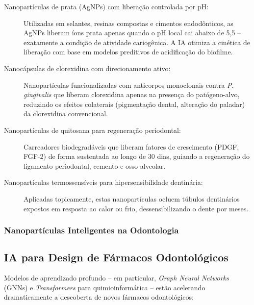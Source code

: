 \begin{description}
  \item[Nanopartículas de prata (AgNPs) com liberação controlada por pH:]
    Utilizadas em selantes, resinas compostas e cimentos endodônticos, as AgNPs
    liberam íons prata apenas quando o pH local cai abaixo de 5,5 -- exatamente
    a condição de atividade cariogênica. A IA otimiza a cinética de liberação
    com base em modelos preditivos de acidificação do biofilme.

  \item[Nanocápsulas de clorexidina com direcionamento ativo:] Nanopartículas
    funcionalizadas com anticorpos monoclonais contra \textit{P. gingivalis}
    que liberam clorexidina apenas na presença do patógeno-alvo, reduzindo os
    efeitos colaterais (pigmentação dental, alteração do paladar) da
    clorexidina convencional.

  \item[Nanopartículas de quitosana para regeneração periodontal:] Carreadores
    biodegradáveis que liberam fatores de crescimento (PDGF, FGF-2) de forma
    sustentada ao longo de 30 dias, guiando a regeneração do ligamento
    periodontal, cemento e osso alveolar.

  \item[Nanopartículas termossensíveis para hipersensibilidade dentinária:]
    Aplicadas topicamente, estas nanopartículas ocluem túbulos dentinários
    expostos em resposta ao calor ou frio, dessensibilizando o dente por meses.
\end{description}

\subsubsection{Nanopartículas Inteligentes na Odontologia}

\subsection{IA para Design de Fármacos Odontológicos}

Modelos de aprendizado profundo -- em particular, \textit{Graph Neural Networks}
(GNNs) e \textit{Transformers} para quimioinformática -- estão acelerando
dramaticamente a descoberta de novos fármacos odontológicos:

